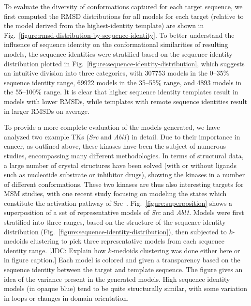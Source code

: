 \documentclass[aps,pre,twocolumn,nofootinbib,superscriptaddress,linenumbers]{revtex4-1}
\begin{document}
To evaluate the diversity of conformations captured for each target sequence, we first computed the RMSD distributions for all models for each target (relative to the model derived from the highest-identity template) are shown in Fig.~\ref{figure:rmsd-distribution-by-sequence-identity}.
To better understand the influence of sequence identity on the conformational similarities of resulting models, the sequence identities were stratified based on the sequence identity distribution plotted in Fig.~\ref{figure:sequence-identity-distribution}, which suggests an intuitive division into three categories, with \num{307753} models in the 0--35\% sequence identity range, \num{69922} models in the 35--55\% range, and \num{4893} models in the 55--100\% range. 
It is clear that higher sequence identity templates result in models with lower RMSDs, while templates with remote sequence identities result in larger RMSDs on average.

To provide a more complete evaluation of the models generated, we have analyzed two example TKs (\emph{Src} and \emph{Abl1}) in detail.
Due to their importance in cancer, as outlined above, these kinases have been the subject of numerous studies, encompassing many different methodologies.
In terms of structural data, a large number of crystal structures have been solved (with or without ligands such as nucleotide substrate or inhibitor drugs), showing the kinases in a number of different conformations.
These two kinases are thus also interesting targets for MSM studies, with one recent study focusing on modeling the states which constitute the activation pathway of Src~\cite{shukla-pande:nature-commun:2014:src-activation-msm}.
Fig.~\ref{figure:superposition} shows a superposition of a set of representative models of \emph{Src} and \emph{Abl1}.
Models were first stratified into three ranges, based on the structure of the sequence identity distribution (Fig.~\ref{figure:sequence-identity-distribution}), then subjected to $k$-medoids clustering to pick three representative models from each sequence identity range.
{\color{red}[JDC: Explain how $k$-medoids clustering was done either here or in figure caption.]}
Each model is colored and given a transparency based on the sequence identity between the target and template sequence.
The figure gives an idea of the variance present in the generated models.
High sequence identity models (in opaque blue) tend to be quite structurally similar, with some variation in loops or changes in domain orientation.
\end{document}
